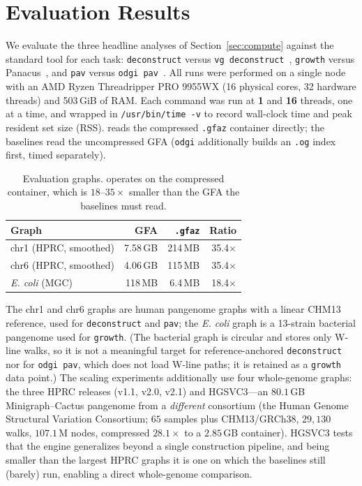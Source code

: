 \section{Evaluation Results}\label{sec:eval-results}

We evaluate the three headline analyses of Section~\ref{sec:compute}
against the standard tool for each task: \texttt{deconstruct} versus
\texttt{vg deconstruct}~\cite{garrison2018variation}, \texttt{growth} versus
Panacus~\cite{parmigiani2024panacus}, and \texttt{pav} versus
\texttt{odgi pav}~\cite{guarracino2022odgi}. All runs were performed on a single
node with an AMD Ryzen Threadripper PRO 9955WX (16 physical cores, 32 hardware
threads) and 503\,GiB of RAM. Each command was run at \textbf{1} and \textbf{16}
threads, one at a time, and wrapped in \texttt{/usr/bin/time\,-v} to record
wall-clock time and peak resident set size (RSS). \gfaz reads the compressed
\texttt{.gfaz} container directly; the baselines read the uncompressed GFA
(\texttt{odgi} additionally builds an \texttt{.og} index first, timed
separately).

\begin{table}[t]
\centering
\caption{Evaluation graphs. \gfaz operates on the compressed container, which is
$18$--$35\times$ smaller than the GFA the baselines must read.}
\label{tab:eval-datasets}
\small
\begin{tabular}{lrrr}
\hline
Graph & GFA & \texttt{.gfaz} & Ratio \\
\hline
chr1 (HPRC, smoothed) & 7.58\,GB & 214\,MB & 35.4$\times$ \\
chr6 (HPRC, smoothed) & 4.06\,GB & 115\,MB & 35.4$\times$ \\
\emph{E. coli} (MGC)  & 118\,MB  & 6.4\,MB & 18.4$\times$ \\
\hline
\end{tabular}
\end{table}

The chr1 and chr6 graphs are human pangenome graphs with a linear CHM13
reference, used for \texttt{deconstruct} and \texttt{pav}; the \emph{E. coli}
graph is a 13-strain bacterial pangenome used for \texttt{growth}. (The bacterial
graph is circular and stores only W-line walks, so it is not a meaningful target
for reference-anchored \texttt{deconstruct} nor for \texttt{odgi pav}, which does
not load W-line paths; it is retained as a \texttt{growth} data point.)
The scaling experiments additionally use four whole-genome graphs: the three
HPRC releases (v1.1, v2.0, v2.1) and HGSVC3---an $80.1$\,GB Minigraph--Cactus
pangenome from a \emph{different} consortium (the Human Genome Structural
Variation Consortium; $65$ samples plus CHM13/GRCh38, $29{,}130$ walks,
$107.1$\,M nodes, compressed $28.1\times$ to a $2.85$\,GB container). HGSVC3
tests that the engine generalizes beyond a single construction pipeline, and
being smaller than the largest HPRC graphs it is one on which the baselines
still (barely) run, enabling a direct whole-genome comparison.

